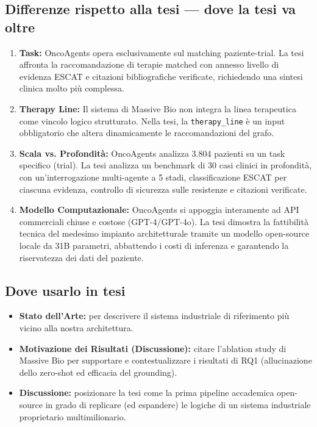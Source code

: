 \documentclass[12pt, a4paper]{article}
\begin{document}
\subsection{Differenze rispetto alla tesi --- dove la tesi va oltre}
\begin{enumerate}[leftmargin=2em, label=\textbf{\arabic*.}]
  \item \textbf{Task:} OncoAgents opera esclusivamente sul matching paziente-trial. La tesi affronta la raccomandazione di terapie matched con annesso livello di evidenza ESCAT e citazioni bibliografiche verificate, richiedendo una sintesi clinica molto più complessa.
  \item \textbf{Therapy Line:} Il sistema di Massive Bio non integra la linea terapeutica come vincolo logico strutturato. Nella tesi, la \texttt{therapy\_line} è un input obbligatorio che altera dinamicamente le raccomandazioni del grafo.
  \item \textbf{Scala vs. Profondità:} OncoAgents analizza 3.804 pazienti su un task specifico (trial). La tesi analizza un benchmark di 30 casi clinici in profondità, con un'interrogazione multi-agente a 5 stadi, classificazione ESCAT per ciascuna evidenza, controllo di sicurezza sulle resistenze e citazioni verificate.
  \item \textbf{Modello Computazionale:} OncoAgents si appoggia interamente ad API commerciali chiuse e costose (GPT-4/GPT-4o). La tesi dimostra la fattibilità tecnica del medesimo impianto architetturale tramite un modello open-source locale da 31B parametri, abbattendo i costi di inferenza e garantendo la riservatezza dei dati del paziente.
\end{enumerate}

\subsection{Dove usarlo in tesi}
\begin{itemize}[leftmargin=1.8em, itemsep=2pt]
  \item \textbf{Stato dell'Arte:} per descrivere il sistema industriale di riferimento più vicino alla nostra architettura.
  \item \textbf{Motivazione dei Risultati (Discussione):} citare l'ablation study di Massive Bio per supportare e contestualizzare i risultati di RQ1 (allucinazione dello zero-shot ed efficacia del grounding).
  \item \textbf{Discussione:} posizionare la tesi come la prima pipeline accademica open-source in grado di replicare (ed espandere) le logiche di un sistema industriale proprietario multimilionario.
\end{itemize}
\end{document}
